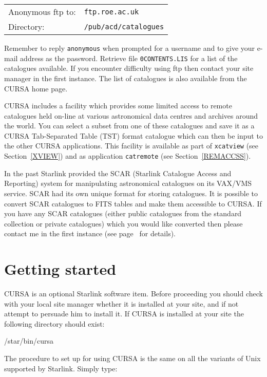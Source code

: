 \documentclass[twoside,11pt]{starlink}
\begin{document}
\begin{tabular}{ll}
Anonymous ftp to: & \texttt{ftp.roe.ac.uk}        \\
Directory:        & \texttt{/pub/acd/catalogues}  \\
\end{tabular}

Remember to reply \texttt{anonymous} when prompted for a username and
to give your e-mail address as the password.  Retrieve file \texttt{0CONTENTS.LIS} for a list of the catalogues available.  If you encounter
difficulty using ftp then contact your site manager in the first
instance.  The list of catalogues is also available from the CURSA home
page.

CURSA includes a facility which provides some limited access to remote
catalogues held on-line at various astronomical data centres and archives
around the world.  You can select a subset from one of these catalogues and
save it as a CURSA Tab-Separated Table (TST) format catalogue which can
then be input to the other CURSA applications. This facility is available
as part of \texttt{xcatview} (see Section~\ref{XVIEW}) and as application \texttt{catremote} (see Section~\ref{REMACCSS}).

In the past Starlink provided the SCAR (Starlink Catalogue Access and
Reporting) system for manipulating astronomical catalogues on its
VAX/VMS service. SCAR had its own unique format for storing catalogues.
It is possible to convert SCAR catalogues to FITS tables and make them
accessible to CURSA. If you have any SCAR catalogues (either public
catalogues from the standard collection or private catalogues) which you
would like converted then please contact me in the first instance (see
page~\pageref{HOMEPAGE} for details).


\section{Getting started}

CURSA is an optional Starlink software item. Before proceeding you should
check with your local site manager whether it is installed at your site,
and if not attempt to persuade him to install it.  If CURSA is installed at
your site the following directory should exist:

\begin{terminalv}
/star/bin/cursa
\end{terminalv}

The procedure to set up for using CURSA is the same on all the variants
of Unix supported by Starlink. Simply type:
\end{document}
